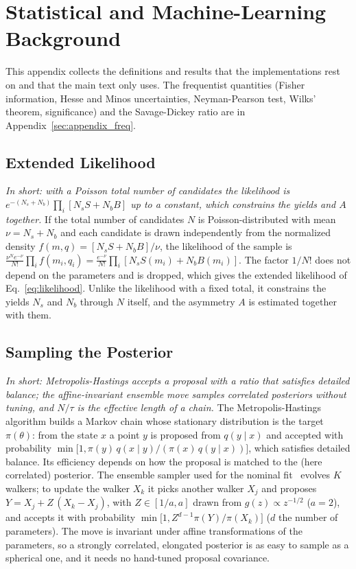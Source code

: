 \section{Statistical and Machine-Learning Background}
\label{app:theory}
This appendix collects the definitions and results that the implementations rest on and that the main text only uses. The frequentist quantities (Fisher information, Hesse and Minos uncertainties, Neyman-Pearson test, Wilks' theorem, significance) and the Savage-Dickey ratio are in Appendix~\ref{sec:appendix_freq}.

\subsection{Extended Likelihood}
\emph{In short: with a Poisson total number of candidates the likelihood is $e^{-(N_s+N_b)}\prod_i[N_s S+N_b B]$ up to a constant, which constrains the yields and $A$ together.}
If the total number of candidates $N$ is Poisson-distributed with mean $\nu=N_s+N_b$ and each candidate is drawn independently from the normalized density $f(m,q)=[N_s S+N_b B]/\nu$, the likelihood of the sample is $\frac{\nu^N e^{-\nu}}{N!}\prod_{i}f(m_i,q_i)=\frac{e^{-\nu}}{N!}\prod_i[N_s S(m_i)+N_b B(m_i)]$. The factor $1/N!$ does not depend on the parameters and is dropped, which gives the extended likelihood of Eq.~\eqref{eq:likelihood}. Unlike the likelihood with a fixed total, it constrains the yields $N_s$ and $N_b$ through $N$ itself, and the asymmetry $A$ is estimated together with them.

\subsection{Sampling the Posterior}
\emph{In short: Metropolis-Hastings accepts a proposal with a ratio that satisfies detailed balance; the affine-invariant ensemble move samples correlated posteriors without tuning, and $N/\tau$ is the effective length of a chain.}
The Metropolis-Hastings algorithm builds a Markov chain whose stationary distribution is the target $\pi(\theta)$: from the state $x$ a point $y$ is proposed from $q(y\mid x)$ and accepted with probability $\min\!\big[1,\pi(y)\,q(x\mid y)/(\pi(x)\,q(y\mid x))\big]$, which satisfies detailed balance. Its efficiency depends on how the proposal is matched to the (here correlated) posterior. The ensemble sampler used for the nominal fit~\cite{goodman_weare,emcee} evolves $K$ walkers; to update the walker $X_k$ it picks another walker $X_j$ and proposes $Y=X_j+Z\,(X_k-X_j)$, with $Z\in[1/a,a]$ drawn from $g(z)\propto z^{-1/2}$ ($a=2$), and accepts it with probability $\min\!\big[1,Z^{d-1}\pi(Y)/\pi(X_k)\big]$ ($d$ the number of parameters). The move is invariant under affine transformations of the parameters, so a strongly correlated, elongated posterior is as easy to sample as a spherical one, and it needs no hand-tuned proposal covariance.

